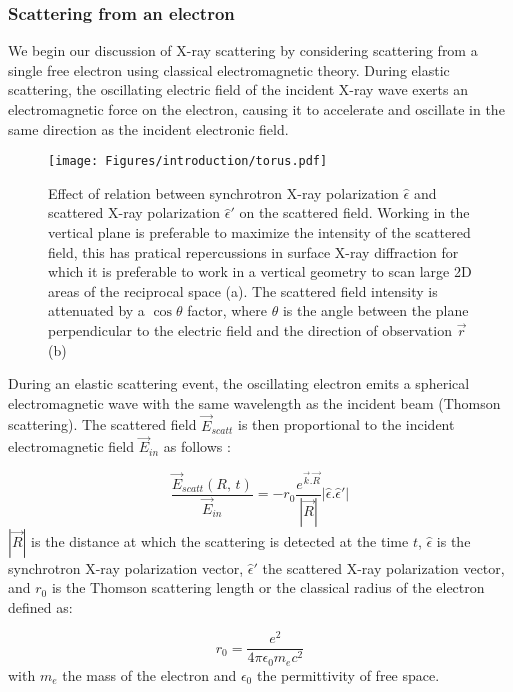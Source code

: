 \subsubsection{Scattering from an electron}

We begin our discussion of X-ray scattering by considering scattering from a single free electron using classical electromagnetic theory.
During elastic scattering, the oscillating electric field of the incident X-ray wave exerts an electromagnetic force on the electron, causing it to accelerate and oscillate in the same direction as the incident electronic field.

\begin{figure}[!htb]
    \centering
    \texttt{[image: Figures/introduction/torus.pdf]}
    \caption{
        Effect of relation between synchrotron X-ray polarization $\hat{\epsilon}$ and scattered X-ray polarization $\hat{\epsilon}'$ on the scattered field.
        Working in the vertical plane is preferable to maximize the intensity of the scattered field, this has pratical repercussions in surface X-ray diffraction for which it is preferable to work in a vertical geometry to scan large 2D areas of the reciprocal space (a).
        The scattered field intensity is attenuated by a $\cos{\theta}$ factor, where $\theta$ is the angle between the plane perpendicular to the electric field and the direction of observation $\vec{r}$ (b)
    }
    \label{fig:polarization_effect}
\end{figure}

During an elastic scattering event, the oscillating electron emits a spherical electromagnetic wave with the same wavelength as the incident beam (Thomson scattering).
The scattered field $\vec{E}_{scatt}$ is then proportional to the incident electromagnetic field $\vec{E}_{in}$ as follows \parencite{NielsenMcMorrow}:

\begin{equation}
    \label{eq:scatt_field}
    \frac{\vec{E}_{scatt}(R, \, t)} {\vec{E}_{in}} = -r_0 \frac{e^{\vec{k}.\vec{R}}} {|\vec{R}|}| \hat{\epsilon}.\hat{\epsilon}'|
\end{equation}
$|\vec{R}|$ is the distance at which the scattering is detected at the time $t$, $\hat{\epsilon}$ is the synchrotron X-ray polarization vector, $\hat{\epsilon}'$ the scattered X-ray polarization vector, and $r_0$ is the Thomson scattering length or the classical radius of the electron defined as:

\begin{equation}
    \label{eq:scatt_thomson_scat_length}
    r_0 = \frac{e^2} {4\pi\epsilon_0 m_e c^2}
\end{equation}
with $m_e$ the mass of the electron and $\epsilon_0$ the permittivity of free space.


